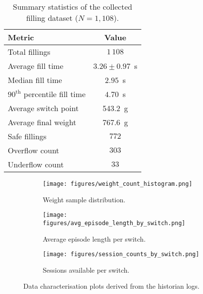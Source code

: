 \documentclass[journal]{IEEEtranTIE}
\begin{document}
\begin{table}[t]
  \centering
  \caption{Summary statistics of the collected filling dataset ($N=1{,}108$).}
  \label{tab:data-stats}
  \begin{tabular}{l c}
    \toprule
    Metric & Value \\
    \midrule
    Total fillings & $1\,108$ \\
    Average fill time & $3.26 \pm 0.97$~s \\
    Median fill time & $2.95$~s \\
    $90^{\mathrm{th}}$ percentile fill time & $4.70$~s \\
    Average switch point & \SI{543.2}{\gram} \\
    Average final weight & \SI{767.6}{\gram} \\
    Safe fillings & $772$ \\
    Overflow count & $303$ \\
    Underflow count & $33$ \\
    \bottomrule
  \end{tabular}
\end{table}

\begin{figure*}[t]
  \centering
  \begin{subfigure}{0.32\textwidth}
    \centering
    \texttt{[image: figures/weight\_count\_histogram.png]}
    \caption{Weight sample distribution.}
    \label{fig:data-hist}
  \end{subfigure}
  \hfill
  \begin{subfigure}{0.32\textwidth}
    \centering
    \texttt{[image: figures/avg\_episode\_length\_by\_switch.png]}
    \caption{Average episode length per switch.}
    \label{fig:data-avglen}
  \end{subfigure}
  \hfill
  \begin{subfigure}{0.32\textwidth}
    \centering
    \texttt{[image: figures/session\_counts\_by\_switch.png]}
    \caption{Sessions available per switch.}
    \label{fig:session-counts}
  \end{subfigure}
  \caption{Data characterisation plots derived from the historian logs.}
  \label{fig:data-overview}
\end{figure*}
\end{document}
